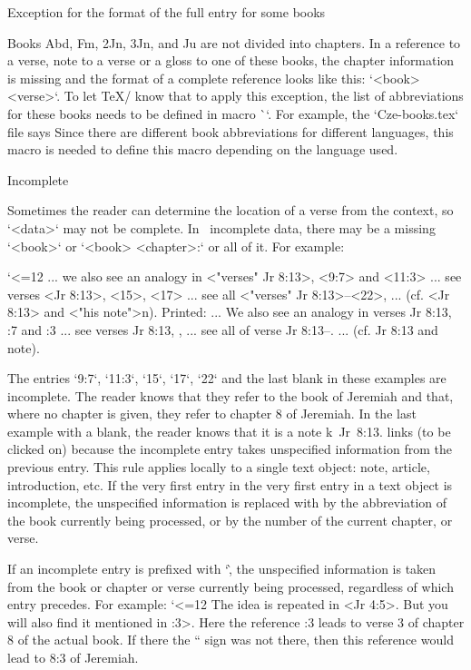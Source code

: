 {{{{{\secc[vudaj] Exception for the format of the full entry for some books

Books Abd, Fm, 2Jn, 3Jn, and Ju are not divided into chapters. In a reference to a verse, note
to a verse or a gloss to one of these books, the chapter information is missing
and the format of a complete reference looks like this: `<book> <verse>`. To let \TeX/ know that
to apply this exception, the list of abbreviations for these books needs to be defined in
macro \`\nochapbooks`. For example, the `Cze-books.tex` file says
\begtt
\def\nochapbooks{Abd Fm 2Jn 3Jn Ju}
\endtt
Since there are different book abbreviations for different languages, this macro is needed
to define this macro depending on the language used.


\secc[bored] Incomplete

Sometimes the reader can determine the location of a verse from the context, so `<data>` may not be complete. In ~{{incomplete data}}, there may be a missing `<book>` or
`<book> <chapter>:` or all of it. For example:

\begtt \catcode`<=12
... we also see an analogy in <"verses" Jr 8:13>, <9:7> and <11:3>
... see verses <Jr 8:13>, <15>, <17>
... see all <"verses" Jr 8:13>--<22>,
... (cf. <Jr 8:13> and <"his note">n).
\endtt
Printed:
... We also see an analogy in {\Blue verses Jr 8:13}, {:7} and {:3}
... see verses {\Blue Jr 8:13}, {}, {}
... see all of {\Blue verse Jr 8:13}--{}.
... (cf. {\Blue Jr 8:13} and {\Blue note}).

The entries `9:7`, `11:3`, `15`, `17`, `22` and the last blank
in these examples are incomplete. The reader knows that they refer to
the book of Jeremiah and that, where no chapter is given, they refer to chapter 8 of
Jeremiah. In the last example with a blank, the reader knows that it is a note
k~Jr~8:13.
links (to be clicked on) because the incomplete entry takes
unspecified information from the previous entry. This rule applies
locally to a single text object: note, article, introduction, etc. If the very first entry in
the very first entry in a text object is incomplete, the unspecified information is replaced with
by the abbreviation of the book currently being processed, or by the number of the current chapter,
or verse.

If an incomplete entry is prefixed with `\`, the unspecified information is taken from
the book or chapter or verse currently being processed, regardless of which entry
precedes. For example:
\begtt \catcode`<=12
 {} The idea is repeated in <Jr 4:5>. But you will also find it mentioned in :3>.
\endtt
Here the reference {:3} leads to verse 3 of chapter 8 of the actual book. If there
the `` sign was not there, then this reference would lead to 8:3 of Jeremiah.

}}}}}
